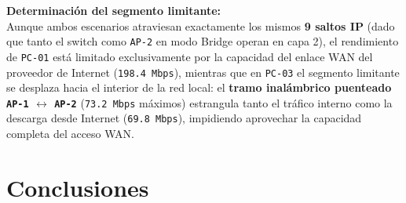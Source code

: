 \documentclass[11pt, a4paper]{article}
\begin{document}
\noindent \textbf{Determinación del segmento limitante:} \\
Aunque ambos escenarios atraviesan exactamente los mismos \textbf{9 saltos IP} (dado que tanto el switch como \texttt{AP-2} en modo Bridge operan en capa 2), el rendimiento de \texttt{PC-01} está limitado exclusivamente por la capacidad del enlace WAN del proveedor de Internet (\texttt{198.4 Mbps}), mientras que en \texttt{PC-03} el segmento limitante se desplaza hacia el interior de la red local: el \textbf{tramo inalámbrico puenteado \texttt{AP-1} $\leftrightarrow$ \texttt{AP-2}} (\texttt{73.2 Mbps} máximos) estrangula tanto el tráfico interno como la descarga desde Internet (\texttt{69.8 Mbps}), impidiendo aprovechar la capacidad completa del acceso WAN.

\section{Conclusiones}
\end{document}
